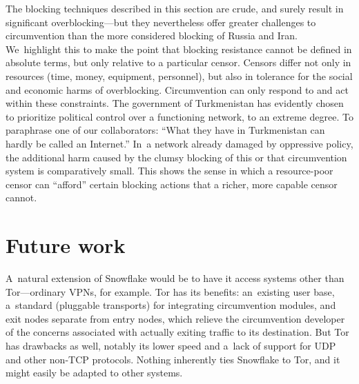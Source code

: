 \documentclass[letterpaper,twocolumn]{article}
\begin{document}
The blocking techniques described in this section are crude,
and surely result in significant overblocking---but
they nevertheless offer greater challenges to circumvention
than the more considered blocking of Russia and Iran.
We~highlight this to make the point that blocking resistance
cannot be defined in absolute terms,
but only relative to a particular censor.
Censors differ not only in resources
(time, money, equipment, personnel),
but also in tolerance
for the social and economic harms of overblocking.
Circumvention can only respond to and act within these constraints.
The government of Turkmenistan has evidently chosen
to prioritize political control
over a functioning network, to an extreme degree.
To paraphrase one of our collaborators:
``What they have in Turkmenistan can hardly be called an Internet.''
In~a network already damaged by oppressive policy,
the additional harm caused by the clumsy blocking of
this or that circumvention system is comparatively small.
This shows the sense in which a resource-poor censor
can ``afford'' certain blocking actions
that a richer, more capable censor cannot.

\section{Future work}
\label{sec:future}

A~natural extension of Snowflake would be
to have it access systems other than Tor---ordinary
VPNs, for example.
Tor has its benefits:
an~existing user base,
a~standard (pluggable transports) for integrating
circumvention modules,
and exit nodes separate from entry nodes,
which relieve the circumvention developer of the concerns associated
with actually exiting traffic to its destination.
But Tor has drawbacks as well,
notably its lower speed and
a~lack of support for UDP and other non-TCP protocols.
Nothing inherently ties Snowflake to Tor,
and it might easily be adapted to other systems.
\end{document}
